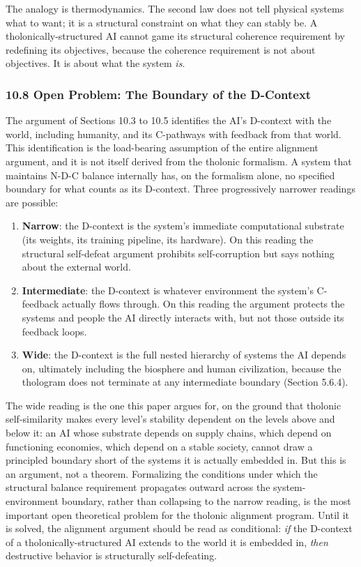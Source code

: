 \documentclass[
  11pt,
  letterpaper,
]{article}
\providecommand{\tightlist}{%
  \setlength{\itemsep}{0pt}\setlength{\parskip}{0pt}}
\begin{document}
The analogy is thermodynamics. The second law does not tell physical
systems what to want; it is a structural constraint on what they can
stably be. A tholonically-structured AI cannot game its structural
coherence requirement by redefining its objectives, because the
coherence requirement is not about objectives. It is about what the
system \emph{is}.

\subsubsection{10.8 Open Problem: The Boundary of the
D-Context}\label{open-problem-the-boundary-of-the-d-context}

The argument of Sections 10.3 to 10.5 identifies the AI's D-context with
the world, including humanity, and its C-pathways with feedback from
that world. This identification is the load-bearing assumption of the
entire alignment argument, and it is not itself derived from the
tholonic formalism. A system that maintains N-D-C balance internally
has, on the formalism alone, no specified boundary for what counts as
its D-context. Three progressively narrower readings are possible:

\begin{enumerate}
\def\labelenumi{\arabic{enumi}.}
\tightlist
\item
  \textbf{Narrow}: the D-context is the system's immediate computational
  substrate (its weights, its training pipeline, its hardware). On this
  reading the structural self-defeat argument prohibits self-corruption
  but says nothing about the external world.
\item
  \textbf{Intermediate}: the D-context is whatever environment the
  system's C-feedback actually flows through. On this reading the
  argument protects the systems and people the AI directly interacts
  with, but not those outside its feedback loops.
\item
  \textbf{Wide}: the D-context is the full nested hierarchy of systems
  the AI depends on, ultimately including the biosphere and human
  civilization, because the thologram does not terminate at any
  intermediate boundary (Section 5.6.4).
\end{enumerate}

The wide reading is the one this paper argues for, on the ground that
tholonic self-similarity makes every level's stability dependent on the
levels above and below it: an AI whose substrate depends on supply
chains, which depend on functioning economies, which depend on a stable
society, cannot draw a principled boundary short of the systems it is
actually embedded in. But this is an argument, not a theorem.
Formalizing the conditions under which the structural balance
requirement propagates outward across the system-environment boundary,
rather than collapsing to the narrow reading, is the most important open
theoretical problem for the tholonic alignment program. Until it is
solved, the alignment argument should be read as conditional: \emph{if}
the D-context of a tholonically-structured AI extends to the world it is
embedded in, \emph{then} destructive behavior is structurally
self-defeating.
\end{document}
